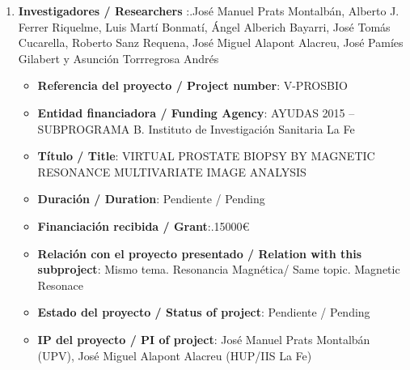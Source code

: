 \begin{enumerate}
 \item {\bf Investigadores / Researchers }:.José Manuel Prats Montalbán, Alberto J. Ferrer Riquelme, Luis Martí Bonmatí, Ángel Alberich Bayarri, José Tomás Cucarella, Roberto Sanz Requena, José Miguel Alapont Alacreu, José Pamíes Gilabert y Asunción Torrregrosa Andrés
 \begin{itemize}
 \item {\bf Referencia del proyecto / Project number}: V-PROSBIO
 \item {\bf Entidad financiadora / Funding Agency}: AYUDAS 2015 – SUBPROGRAMA B. Instituto de Investigación Sanitaria La Fe
 \item {\bf Título / Title}: VIRTUAL PROSTATE BIOPSY BY MAGNETIC RESONANCE MULTIVARIATE IMAGE ANALYSIS 
 \item {\bf Duración / Duration}: Pendiente / Pending 
  \item {\bf Financiación recibida / Grant}:.15000\euro
 \item {\bf Relación con el proyecto presentado / Relation with this subproject}: Mismo tema. Resonancia Magnética/ Same topic. Magnetic Resonace
 \item {\bf Estado del proyecto / Status of project}: Pendiente / Pending 
 \item {\bf IP del proyecto / PI of project}: José Manuel Prats Montalbán (UPV), José Miguel Alapont Alacreu (HUP/IIS La Fe)
 \end{itemize}

\end{enumerate}


